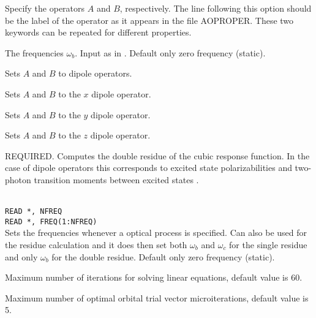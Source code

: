 \begin{description}

\item[, ]
Specify the operators $A$ and $B$, respectively. The line following this
option should be the label of the operator as it appears in the file
AOPROPER. These two keywords can be repeated for different properties.

\item[]
The frequencies
$\omega_b$. Input as in .
Default only zero frequency (static).

\item{}
Sets $A$ and  $B$ to dipole operators.

\item{}
Sets $A$ and $B$ to the $x$ dipole operator.

\item{}
Sets $A$ and $B$ to the $y$ dipole operator.

\item{}
Sets $A$ and $B$ to the $z$ dipole operator.

\item{}
REQUIRED.
Computes the double residue of the cubic
response function.
In the case of dipole operators this corresponds to excited
state polarizabilities and two-photon transition
moments
between excited states \cite{djpnylhajcp105}.

\item{}\\
\verb|READ *, NFREQ|\\
\verb|READ *, FREQ(1:NFREQ)|\\
Sets the frequencies whenever a optical process is specified.
Can also be used for the residue calculation and it does then set
both $\omega_b$ and $\omega_c$ for the single residue and only
$\omega_b$ for the double residue.
Default only zero frequency (static).

\item{}
Maximum number of iterations for solving linear equations, default value is 60.

\item{}
Maximum number of optimal orbital trial vector microiterations,
default value is 5.


\end{description}
